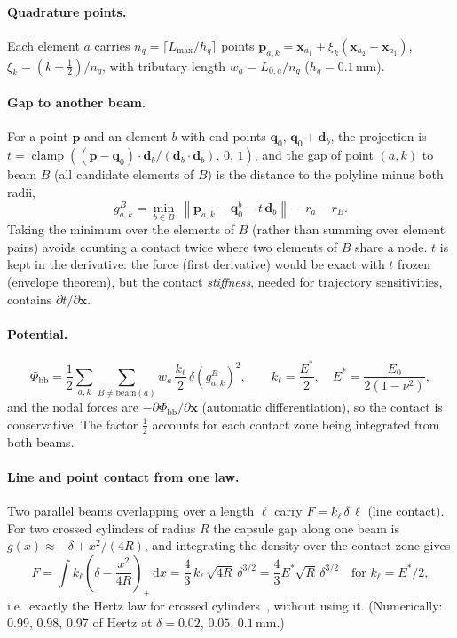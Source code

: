 \documentclass[11pt,a4paper]{article}
\newcommand{\vect}[1]{\bm{#1}}
\newcommand{\dd}{\,\mathrm{d}}
\begin{document}
\paragraph{Quadrature points.} Each element $a$ carries $n_q = \lceil L_{\max}/h_q\rceil$ points
$\vect{p}_{a,k} = \vect{x}_{a_1} + \xi_k(\vect{x}_{a_2}-\vect{x}_{a_1})$, $\xi_k = (k+\tfrac12)/n_q$, with
tributary length $w_a = L_{0,a}/n_q$ ($h_q = 0.1$\,mm).

\paragraph{Gap to another beam.} For a point $\vect p$ and an element $b$ with end points $\vect q_0$,
$\vect q_0 + \vect d_b$, the projection is
$t = \operatorname{clamp}\left((\vect p-\vect q_0)\cdot\vect d_b/(\vect d_b\cdot\vect d_b),\,0,\,1\right)$, and
the gap of point $(a,k)$ to beam $B$ (all candidate elements of $B$) is the distance to the polyline minus both
radii,
\begin{equation}
g_{a,k}^{B} = \min_{b\in B}\ \left\lVert \vect p_{a,k} - \vect q_0^b - t\,\vect d_b\right\rVert - r_a - r_B .
\end{equation}
Taking the minimum over the elements of $B$ (rather than summing over element pairs) avoids counting a contact
twice where two elements of $B$ share a node. $t$ is kept in the derivative: the force (first derivative) would
be exact with $t$ frozen (envelope theorem), but the contact \emph{stiffness}, needed for trajectory
sensitivities, contains $\partial t/\partial\vect x$.

\paragraph{Potential.}
\begin{equation}
\Phi_\mathrm{bb} = \frac12\sum_{a,k}\sum_{B\neq\mathrm{beam}(a)} w_a\,\frac{k_\ell}{2}\,\delta\!\left(g_{a,k}^{B}\right)^2,
\qquad k_\ell = \frac{E^*}{2},\quad E^* = \frac{E_0}{2(1-\nu^2)},
\end{equation}
and the nodal forces are $-\partial\Phi_\mathrm{bb}/\partial\vect x$ (automatic differentiation), so the
contact is conservative. The factor $\tfrac12$ accounts for each contact zone being integrated from both beams.

\paragraph{Line and point contact from one law.} Two parallel beams overlapping over a length $\ell$ carry
$F = k_\ell\,\delta\,\ell$ (line contact). For two crossed cylinders of radius $R$ the capsule gap along one
beam is $g(x) \approx -\delta + x^2/(4R)$, and integrating the density over the contact zone gives
\begin{equation}
F = \int k_\ell\left(\delta - \frac{x^2}{4R}\right)_{\!+}\dd x = \frac{4}{3}\,k_\ell\,\sqrt{4R}\,\delta^{3/2}
= \frac{4}{3}E^*\sqrt{R}\,\delta^{3/2}\quad\text{for } k_\ell = E^*/2,
\end{equation}
i.e.\ exactly the Hertz law for crossed cylinders~\cite{johnson1985}, without using it. (Numerically: 0.99,
0.98, 0.97 of Hertz at $\delta = 0.02$, $0.05$, $0.1$\,mm.)
\end{document}
